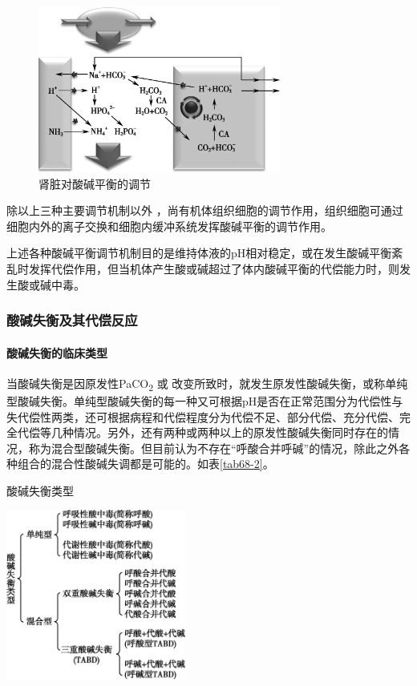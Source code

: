 \begin{figure}[!htbp]
 \centering
 \includegraphics[width=3.13542in,height=2.15625in]{./images/Image00273.jpg}
 \captionsetup{justification=centering}
 \caption{肾脏对酸碱平衡的调节}
 \label{fig68-2}
  \end{figure} 

除以上三种主要调节机制以外
，尚有机体组织细胞的调节作用，组织细胞可通过细胞内外的离子交换和细胞内缓冲系统发挥酸碱平衡的调节作用。

上述各种酸碱平衡调节机制目的是维持体液的pH相对稳定，或在发生酸碱平衡紊乱时发挥代偿作用，但当机体产生酸或碱超过了体内酸碱平衡的代偿能力时，则发生酸或碱中毒。

\subsubsection{酸碱失衡及其代偿反应}

\paragraph{酸碱失衡的临床类型}

当酸碱失衡是因原发性PaCO\textsubscript{2} 或{}
改变所致时，就发生原发性酸碱失衡，或称单纯型酸碱失衡。单纯型酸碱失衡的每一种又可根据pH是否在正常范围分为代偿性与失代偿性两类，还可根据病程和代偿程度分为代偿不足、部分代偿、充分代偿、完全代偿等几种情况。另外，还有两种或两种以上的原发性酸碱失衡同时存在的情况，称为混合型酸碱失衡。但目前认为不存在“呼酸合并呼碱”的情况，除此之外各种组合的混合性酸碱失调都是可能的。如表\ref{tab68-2}。

\begin{table}[htbp]
\centering
\caption{酸碱失衡类型}
\label{tab68-2}
\includegraphics[width=2.32292in,height=2.20833in]{./images/Image00275.jpg}
\end{table}

